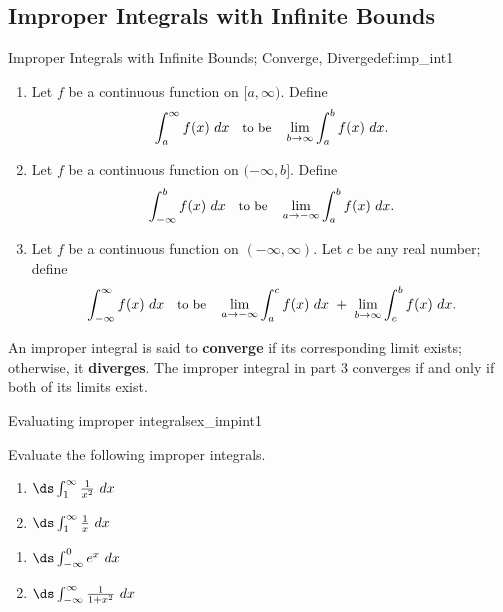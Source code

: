 \subsection*{Improper Integrals with Infinite Bounds}

\begin{definition}{Improper Integrals with Infinite Bounds; Converge, Diverge}{def:imp_int1}
{
\begin{enumerate}
\item		Let $f$ be a continuous function on $[a,\infty)$. Define 
$$\small\int_a^\infty f(x)\ dx \quad \text{to be}\quad \lim_{b\to\infty}\int_a^b f(x)\ dx.$$

\item		Let $f$ be a continuous function on $(-\infty,b]$. Define
$$\small\int_{-\infty}^b f(x)\ dx \quad \text{to be}\quad \lim_{a\to-\infty}\int_a^b f(x)\ dx.$$

\item		Let $f$ be a continuous function on $(-\infty,\infty)$. Let $c$ be any real number; define
$$\small\int_{-\infty}^\infty f(x)\ dx \quad \text{to be}\quad \lim_{a\to-\infty}\int_a^c f(x)\ dx\ +\ \lim_{b\to\infty}\int_c^b f(x)\ dx.$$
\end{enumerate}
An improper integral is said to \textbf{converge} if its corresponding limit exists; otherwise, it \textbf{diverges}. The improper integral in part 3 converges if and only if both of its limits exist.
}
\end{definition}


\begin{example}{Evaluating improper integrals}{ex_impint1}
{
Evaluate the following improper integrals.\\
\noindent%
\begin{minipage}[t]{.5\textwidth}
\begin{enumerate}
\item		$\ds\int_1^\infty \frac1{x^2}\ dx$
\item		$\ds\int_1^\infty \frac1x\ dx$
\end{enumerate}
\end{minipage}
\begin{minipage}[t]{.5\textwidth}
\begin{enumerate}\addtocounter{enumi}{2}
\item		$\ds\int_{-\infty}^0 e^x\ dx$
\item		$\ds\int_{-\infty}^\infty \frac1{1+x^2}\ dx$
\end{enumerate}
\end{minipage}
}
\end{example}

